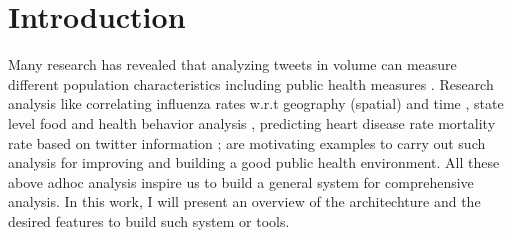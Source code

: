 \section*{Introduction}
\label{sec:intro}
Many research has revealed that analyzing tweets in volume can measure different population characteristics including public
health measures \cite{paul2011you, paul2012model, eichstaedt2015psychological, barros2018disease, mueller2018crowdbreaks, karami2018characterizing}.
Research analysis like correlating influenza rates w.r.t geography (spatial) and time \cite{signorini2011use}, state level food and health behavior analysis \cite{nguyen2017social}, predicting heart disease rate mortality rate based on twitter information \cite{eichstaedt2015psychological}; are motivating examples to carry out such analysis for improving and building a good public health environment.
All these above adhoc analysis inspire us to build a general system for comprehensive analysis.
In this work, I will present an overview of the architechture and the desired features to build such system or tools.




